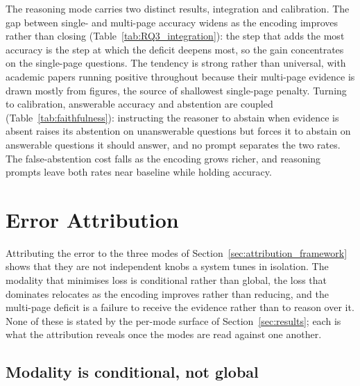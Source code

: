 \documentclass[11pt]{article}
\begin{document}
The reasoning mode carries two distinct results, integration and calibration. The gap between single- and multi-page accuracy widens as the encoding improves rather than closing (Table~\ref{tab:RQ3_integration}): the step that adds the most accuracy is the step at which the deficit deepens most, so the gain concentrates on the single-page questions. The tendency is strong rather than universal, with academic papers running positive throughout because their multi-page evidence is drawn mostly from figures, the source of shallowest single-page penalty. Turning to calibration, answerable accuracy and abstention are coupled (Table~\ref{tab:faithfulness}): instructing the reasoner to abstain when evidence is absent raises its abstention on unanswerable questions but forces it to abstain on answerable questions it should answer, and no prompt separates the two rates. The false-abstention cost falls as the encoding grows richer, and reasoning prompts leave both rates near baseline while holding accuracy.

\section{Error Attribution}
\label{sec:attribution}

Attributing the error to the three modes of Section~\ref{sec:attribution_framework} shows that they are not independent knobs a system tunes in isolation. The modality that minimises loss is conditional rather than global, the loss that dominates relocates as the encoding improves rather than reducing, and the multi-page deficit is a failure to receive the evidence rather than to reason over it. None of these is stated by the per-mode surface of Section~\ref{sec:results}; each is what the attribution reveals once the modes are read against one another.






\subsection{Modality is conditional, not global}
\label{subsec:attr_modality}
\end{document}
